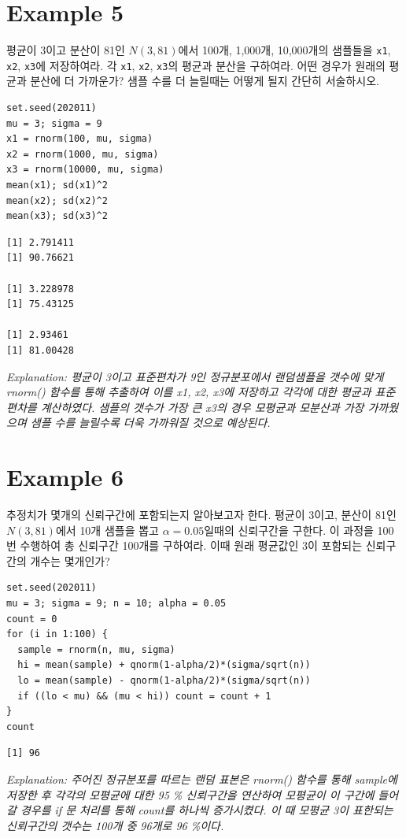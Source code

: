 \documentclass{article}
\begin{document}
\section*{Example 5}
평균이 3이고 분산이 81인 $N(3,81)$에서 100개, 1,000개, 10,000개의 샘플들을 \texttt{x1}, \texttt{x2}, \texttt{x3}에 저장하여라. 각 \texttt{x1}, \texttt{x2}, \texttt{x3}의 평균과 분산을 구하여라. 어떤 경우가 원래의 평균과 분산에 더 가까운가? 샘플 수를 더 늘릴때는 어떻게 될지 간단히 서술하시오.
\begin{lstlisting}[style={r-style}]
set.seed(202011)
mu = 3; sigma = 9
x1 = rnorm(100, mu, sigma)
x2 = rnorm(1000, mu, sigma)
x3 = rnorm(10000, mu, sigma)
mean(x1); sd(x1)^2
mean(x2); sd(x2)^2
mean(x3); sd(x3)^2
\end{lstlisting}
\begin{lstlisting}[style={out-style}]
[1] 2.791411
[1] 90.76621

[1] 3.228978
[1] 75.43125

[1] 2.93461
[1] 81.00428
\end{lstlisting}
\emph{Explanation: 평균이 3이고 표준편차가 9인 정규분포에서 랜덤샘플을 갯수에 맞게 rnorm() 함수를 통해 추출하여 이를 x1, x2, x3에 저장하고 각각에 대한 평균과 표준편차를 계산하였다. 샘플의 갯수가 가장 큰 x3의 경우 모평균과 모분산과 가장 가까웠으며 샘플 수를 늘릴수록 더욱 가까워질 것으로 예상된다. } \\

\section*{Example 6}
추정치가 몇개의 신뢰구간에 포함되는지 알아보고자 한다. 평균이 3이고, 분산이 81인 $N(3,81)$에서 10개 샘플을 뽑고 $\alpha=0.05$일때의 신뢰구간을 구한다. 이 과정을 100번 수행하여 총 신뢰구간 100개를 구하여라. 이때 원래 평균값인 3이 포함되는 신뢰구간의 개수는 몇개인가? 
\begin{lstlisting}[style={r-style}]
set.seed(202011)
mu = 3; sigma = 9; n = 10; alpha = 0.05
count = 0
for (i in 1:100) {
  sample = rnorm(n, mu, sigma)
  hi = mean(sample) + qnorm(1-alpha/2)*(sigma/sqrt(n))
  lo = mean(sample) - qnorm(1-alpha/2)*(sigma/sqrt(n))
  if ((lo < mu) && (mu < hi)) count = count + 1
}
count
\end{lstlisting}
\begin{lstlisting}[style={out-style}]
[1] 96
\end{lstlisting}
\emph{Explanation: 주어진 정규분포를 따르는 랜덤 표본은 rnorm() 함수를 통해 sample에 저장한 후 각각의 모평균에 대한 95 \% 신뢰구간을 연산하여 모평균이 이 구간에 들어갈 경우를 if 문 처리를 통해 count를 하나씩 증가시켰다. 이 때 모평균 3이 표한되는 신뢰구간의 갯수는 100개 중 96개로 96 \%이다.} \\
\end{document}
